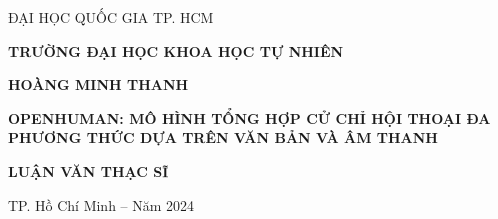 \begin{titlepage}


\begin{mdframed}[linewidth=1pt, %
	linecolor=black, %
	leftmargin=0, %
	rightmargin=0, %
	innertopmargin=20mm, %
	innerbottommargin=20mm, %
	innerleftmargin=25mm, %
	innerrightmargin=25mm, %
	skipabove=0, %
	skipbelow=0] %
	\centering
	\vspace*{1cm}
	
	{\large
		ĐẠI HỌC QUỐC GIA TP. HCM\par}
	\vspace{0.25cm}
	{\large \textbf{TRƯỜNG ĐẠI HỌC KHOA HỌC TỰ NHIÊN}\par}
	
	\vspace{2cm}
	
	{\large
		\MakeUppercase{\textbf{HOÀNG MINH THANH}}\par}
	
	\vspace{2cm}
	
	{\Large \bfseries
		OPENHUMAN: MÔ HÌNH TỔNG HỢP CỬ CHỈ HỘI THOẠI ĐA PHƯƠNG THỨC DỰA TRÊN VĂN BẢN VÀ ÂM THANH\par}
	
	\vspace{3cm}
	
	{\large \bfseries
		LUẬN VĂN THẠC SĨ\par}
		
	\vfill
	
	{\small
		TP. Hồ Chí Minh – Năm 2024 \par}
\end{mdframed}
\end{titlepage}

\pagebreak

